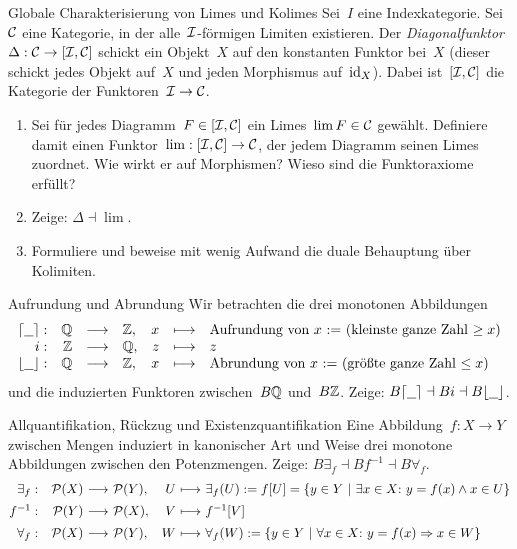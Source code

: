 \documentclass{uebblatt}
\begin{document}
\newpage
\begin{aufgabe}{Globale Charakterisierung von Limes und Kolimes}
Sei~$I$ eine Indexkategorie. Sei~$\mathcal{C}$ eine Kategorie, in der alle~$\mathcal{I}$-förmigen
Limiten existieren. Der \emph{Diagonalfunktor}~$\Delta : \mathcal{C} \to
[\mathcal{I},\mathcal{C}]$ schickt ein Objekt~$X$ auf den konstanten Funktor bei~$X$ (dieser
schickt jedes Objekt auf~$X$ und jeden Morphismus auf~$\mathrm{id}_X$). Dabei
ist~$[\mathcal{I},\mathcal{C}]$ die Kategorie der Funktoren~$\mathcal{I} \to \mathcal{C}$.
\begin{enumerate}
\item Sei für jedes Diagramm~$F \in [\mathcal{I},\mathcal{C}]$ ein Limes~$\lim F \in \mathcal{C}$ gewählt.
Definiere damit einen Funktor~$\lim : [\mathcal{I},\mathcal{C}] \to \mathcal{C}$, der jedem Diagramm
seinen Limes zuordnet. Wie wirkt er auf Morphismen? Wieso sind die
Funktoraxiome erfüllt?
\item Zeige: $\Delta \dashv \lim$.
\item Formuliere und beweise mit wenig Aufwand die duale Behauptung
über Kolimiten.
\end{enumerate}
\end{aufgabe}

\begin{aufgabe}{Aufrundung und Abrundung}
Wir betrachten die drei monotonen Abbildungen
\[ \begin{array}{@{}rrclrcl@{}}
  \lceil\smallplaceholder\rceil: & \QQ &\longrightarrow& \ZZ, &
  x &\longmapsto& \text{Aufrundung von~$x$ := (kleinste ganze Zahl~$\geq x$)} \\
  i: & \ZZ &\longrightarrow& \QQ, &
  z &\longmapsto& z \\
  \lfloor\smallplaceholder\rfloor: & \QQ &\longrightarrow& \ZZ, &
  x &\longmapsto& \text{Abrundung von~$x$ := (größte ganze Zahl~$\leq x$)}
\end{array} \]
und die induzierten Funktoren zwischen~$B\mathbb{Q}$ und~$B\mathbb{Z}$.
Zeige:
$B\lceil\underline{\ \ }\rceil \dashv Bi \dashv B\lfloor\underline{\ \ }\rfloor$.
\end{aufgabe}

\begin{aufgabe}{Allquantifikation, Rückzug und Existenzquantifikation}
Eine Abbildung~$f : X \to Y$ zwischen Mengen induziert in kanonischer Art und
Weise drei monotone Abbildungen zwischen den Potenzmengen.
Zeige: $B\exists_f \dashv Bf^{-1} \dashv B\forall_f$.
\[ \begin{array}{@{}rr@{\ }c@{\ }lr@{\ }c@{\ }l@{}}
  \exists_f : & \P(X) &\longrightarrow& \P(Y), &
    U &\longmapsto& \exists_f(U) := f[U] = \{ y \in Y \ |\ \exists x \in
    X{:}\ y = f(x) \wedge x \in U \} \\[0.5em]
  f^{-1} : & \P(Y) &\longrightarrow& \P(X), &
    V &\longmapsto& f^{-1}[V] \\[0.5em]
  \forall_f : & \P(X) &\longrightarrow& \P(Y), &
    W &\longmapsto& \forall_f(W) := \{ y \in Y \ |\ \forall x \in X{:}\
      y = f(x) \Rightarrow x \in W \}
\end{array} \]
\vspace{-1em}
\end{aufgabe}
\end{document}
